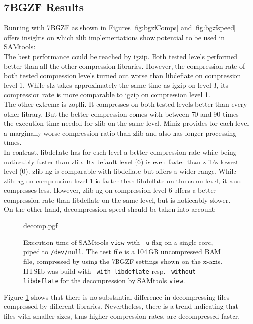 \subsection{7BGZF Results}
Running \sort with 7BGZF as shown in Figures \ref{fig:bgzfComps} and \ref{fig:bgzfspeed} offers insights on which zlib implementations show potential to be used in SAMtools: \\
The best performance could be reached by igzip. Both tested levels performed better than all the other compression libraries. However, the compression rate of both tested compression levels turned out worse than libdeflate on compression level 1. While slz takes approximately the same time as igzip on level 3, its compression rate is more comparable to igzip on compression level 1. \\
The other extreme is zopfli. It compresses on both tested levels better than every other library. But the better compression comes with between 70 and 90 times the execution time needed for zlib on the same level.
Miniz provides for each level a marginally worse compression ratio than zlib and also has longer processing times. \\
In contrast, libdeflate has for each level a better compression rate while being noticeably faster than zlib. Its default level (6) is even faster than zlib's lowest level (0).
zlib-ng is comparable with libdeflate but offers a wider range. While zlib-ng on compression level 1 is faster than libdeflate on the same level, it also compresses less. However, zlib-ng on compression level 6 offers a better compression rate than libdeflate on the same level, but is noticeably slower. \\
On the other hand, decompression speed should be taken into account: 
\begin{figure}[t]
        {decomp.pgf}
    \caption{Execution time of SAMtools \texttt{view} with \texttt{-u} flag on a single core, piped to \texttt{/dev/null}. The test file is a 104\,GB uncompressed BAM file, compressed by \sort using the 7BGZF settings shown on the x-axis. HTSlib was build with \texttt{--with-libdeflate} resp. \texttt{--without-libdeflate} for the decompression by SAMtools \texttt{view}.}
    \label{fig:decomp}
\end{figure}
Figure \ref{fig:decomp} shows that there is no substantial difference in decompressing files compressed by different libraries. Nevertheless, there is a trend indicating that files with smaller sizes, thus higher compression rates, are decompressed faster. 
